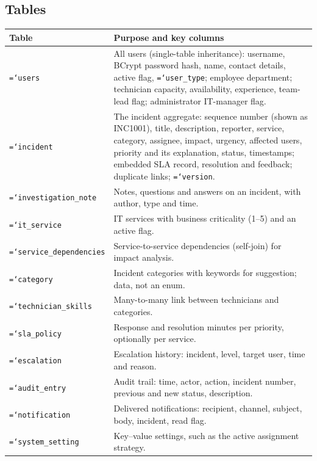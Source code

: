 \documentclass[11pt,a4paper]{article}
\newcommand{\code}[1]{\texttt{\hyphenchar\font=`\-\relax #1}}
\begin{document}
\subsection{Tables}
\begin{longtable}{@{}L{4cm}L{11.2cm}@{}}
\toprule
\textbf{Table} & \textbf{Purpose and key columns} \\
\midrule\endhead
\code{users} & All users (single-table inheritance): username, BCrypt password hash, name, contact details, active flag, \code{user\_type}; employee department; technician capacity, availability, experience, team-lead flag; administrator IT-manager flag. \\
\code{incident} & The incident aggregate: sequence number (shown as INC1001), title, description, reporter, service, category, assignee, impact, urgency, affected users, priority and its explanation, status, timestamps; embedded SLA record, resolution and feedback; duplicate links; \code{version}. \\
\code{investigation\_note} & Notes, questions and answers on an incident, with author, type and time. \\
\code{it\_service} & IT services with business criticality (1--5) and an active flag. \\
\code{service\_dependencies} & Service-to-service dependencies (self-join) for impact analysis. \\
\code{category} & Incident categories with keywords for suggestion; data, not an enum. \\
\code{technician\_skills} & Many-to-many link between technicians and categories. \\
\code{sla\_policy} & Response and resolution minutes per priority, optionally per service. \\
\code{escalation} & Escalation history: incident, level, target user, time and reason. \\
\code{audit\_entry} & Audit trail: time, actor, action, incident number, previous and new status, description. \\
\code{notification} & Delivered notifications: recipient, channel, subject, body, incident, read flag. \\
\code{system\_setting} & Key--value settings, such as the active assignment strategy. \\
\bottomrule
\end{longtable}
\end{document}
